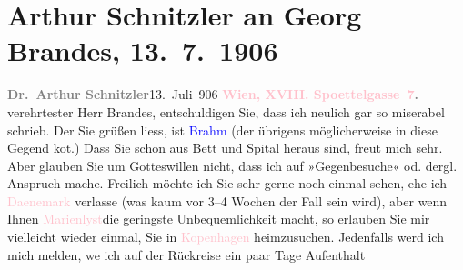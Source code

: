 

               \section[Arthur Schnitzler an Georg Brandes, 13. 7. 1906]{ Arthur Schnitzler an Georg Brandes, 13. 7. 1906}\nopagebreak{}\rehead{ }\normalsize\beginnumbering{} \toendnotes[C]{\smallbreak\pagebreak[2]} 
\pstart
           \noindent{}{\pb}\textcolor{gray}{\textbf{Dr. Arthur Schnitzler}}\hfill 13. Juli 906\pend
           \pstart
           \textcolor{gray}{\textbf{\textcolor{pink}{Wien, XVIII. Spoettelgasse 7}{}\ledrightnote{\textcolor{pink}{Edmund-Weiß-Gasse}}.}}\pend
           \pstart{}verehrtester Herr Brandes,\pend\pstart
           entschuldigen Sie, dass ich neulich gar so miserabel schrieb. Der Sie grüßen
                    liess, ist \textcolor{blue}{Brahm}{}\ledrightnote{\textcolor{blue}{Otto Brahm}} (der übrigens
                    möglicherweise in diese Gegend ko{\geminationm}t.) Dass Sie
                    schon aus Bett und Spital heraus sind, freut mich sehr. Aber glauben Sie um
                    Gotteswillen nicht, dass ich auf »Gegenbesuche« od. dergl. Anspruch mache.
                    Freilich möchte ich Sie sehr gerne noch einmal sehen, ehe ich \textcolor{pink}{Daenemark}{}\ledrightnote{\textcolor{pink}{Dänemark}} verlasse (was kaum vor 3–4 Wochen der Fall sein
                    wird), aber wenn Ihnen \textcolor{pink}{Marienlyst}{}\ledrightnote{\textcolor{pink}{Marienlyst}}{ }{\pb}die geringste Unbequemlichkeit macht, so
                    erlauben Sie mir vielleicht wieder einmal, Sie in \textcolor{pink}{Kopenhagen}{}\ledrightnote{\textcolor{pink}{Kopenhagen}} heimzusuchen. Jedenfalls werd ich mich melden, we{\geminationn} ich auf der Rückreise ein paar Tage Aufenthalt
